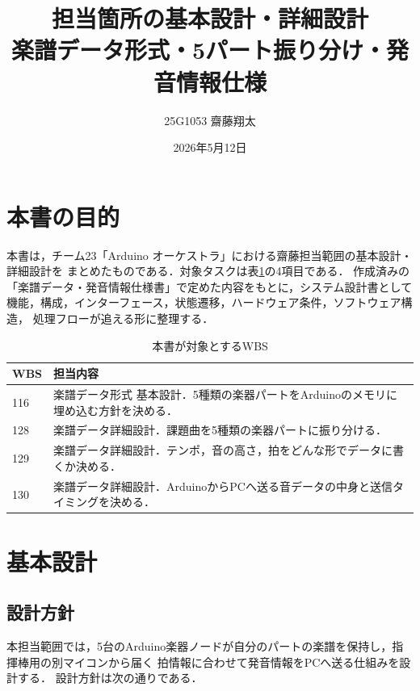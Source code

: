 \documentclass[uplatex,dvipdfmx]{jlreq}
\begin{document}
\title{担当箇所の基本設計・詳細設計\\
{\large 楽譜データ形式・5パート振り分け・発音情報仕様}}
\author{25G1053 齋藤翔太}
\date{2026年5月12日}
\maketitle

\section*{本書の目的}

本書は，チーム23「Arduino オーケストラ」における齋藤担当範囲の基本設計・詳細設計を
まとめたものである．対象タスクは表\ref{tab:wbs-scope}の4項目である．
作成済みの「楽譜データ・発音情報仕様書」で定めた内容をもとに，システム設計書として
機能，構成，インターフェース，状態遷移，ハードウェア条件，ソフトウェア構造，
処理フローが追える形に整理する．

\begin{table}[H]
\centering
\caption{本書が対象とするWBS}
\label{tab:wbs-scope}
\begin{tabular}{p{}p{}}
\toprule
\textbf{WBS} & \textbf{担当内容} \\
\midrule
116 & 楽譜データ形式 基本設計．5種類の楽器パートをArduinoのメモリに埋め込む方針を決める．\\
128 & 楽譜データ詳細設計．課題曲を5種類の楽器パートに振り分ける．\\
129 & 楽譜データ詳細設計．テンポ，音の高さ，拍をどんな形でデータに書くか決める．\\
130 & 楽譜データ詳細設計．ArduinoからPCへ送る音データの中身と送信タイミングを決める．\\
\bottomrule
\end{tabular}
\end{table}

\section{基本設計}

\subsection{設計方針}

本担当範囲では，5台のArduino楽器ノードが自分のパートの楽譜を保持し，指揮棒用の別マイコンから届く
拍情報に合わせて発音情報をPCへ送る仕組みを設計する．
設計方針は次の通りである．
\end{document}
